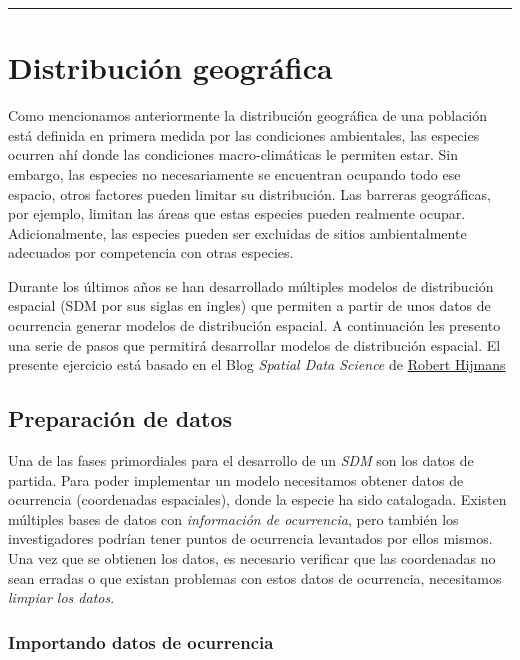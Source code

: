 \documentclass[]{article}
\begin{document}
\begin{center}\rule{0.5\linewidth}{\linethickness}\end{center}

\section{Distribución geográfica}\label{distribucion-geografica}

Como mencionamos anteriormente la distribución geográfica de una
población está definida en primera medida por las condiciones
ambientales, las especies ocurren ahí donde las condiciones
macro-climáticas le permiten estar. Sin embargo, las especies no
necesariamente se encuentran ocupando todo ese espacio, otros factores
pueden limitar su distribución. Las barreras geográficas, por ejemplo,
limitan las áreas que estas especies pueden realmente ocupar.
Adicionalmente, las especies pueden ser excluidas de sitios
ambientalmente adecuados por competencia con otras especies.

Durante los últimos años se han desarrollado múltiples modelos de
distribución espacial (SDM por sus siglas en ingles) que permiten a
partir de unos datos de ocurrencia generar modelos de distribución
espacial. A continuación les presento una serie de pasos que permitirá
desarrollar modelos de distribución espacial. El presente ejercicio está
basado en el Blog \emph{Spatial Data Science} de
\href{https://rspatial.org/raster/sdm/index.html}{Robert Hijmans}

\subsection{Preparación de datos}\label{preparacion-de-datos}

Una de las fases primordiales para el desarrollo de un \emph{SDM} son
los datos de partida. Para poder implementar un modelo necesitamos
obtener datos de ocurrencia (coordenadas espaciales), donde la especie
ha sido catalogada. Existen múltiples bases de datos con
\emph{información de ocurrencia}, pero también los investigadores
podrían tener puntos de ocurrencia levantados por ellos mismos. Una vez
que se obtienen los datos, es necesario verificar que las coordenadas no
sean erradas o que existan problemas con estos datos de ocurrencia,
necesitamos \emph{limpiar los datos}.

\subsubsection{Importando datos de
ocurrencia}\label{importando-datos-de-ocurrencia}
\end{document}
